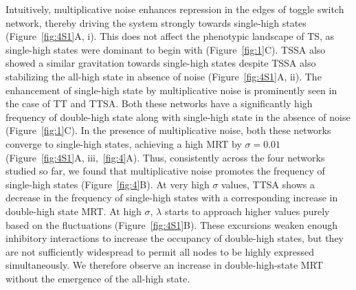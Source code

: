 \documentclass[11pt]{article}
\begin{document}
Intuitively, multiplicative noise enhances repression in the edges of toggle switch network, thereby driving the system strongly towards single-high states (Figure~\ref{fig:4S1}A, i). This does not affect the phenotypic landscape of TS, as single-high states were dominant to begin with (Figure~\ref{fig:1}C). TSSA also showed a similar gravitation towards single-high states despite TSSA also stabilizing the all-high state in absence of noise (Figure~\ref{fig:4S1}A, ii). The enhancement of single-high state by multiplicative noise is prominently seen in the case of TT and TTSA. Both these networks have a significantly high frequency of double-high state along with single-high state in the absence of noise (Figure~\ref{fig:1}C). In the presence of multiplicative noise, both these networks converge to single-high states, achieving a high MRT by $\sigma = 0.01$ (Figure~\ref{fig:4S1}A, iii,~\ref{fig:4}A). Thus, consistently across the four networks studied so far, we found that multiplicative noise promotes the frequency of single-high states (Figure~\ref{fig:4}B). At very high $\sigma$ values, TTSA shows a decrease in the frequency of single-high states with a corresponding increase in double-high state MRT. At high $\sigma$, $\lambda$ starts to approach higher values purely based on the fluctuations (Figure~\ref{fig:4S1}B). These excursions weaken enough inhibitory interactions to increase the occupancy of double-high states, but they are not sufficiently widespread to permit all nodes to be highly expressed simultaneously. We therefore observe an increase in double-high-state MRT without the emergence of the all-high state.
\end{document}
